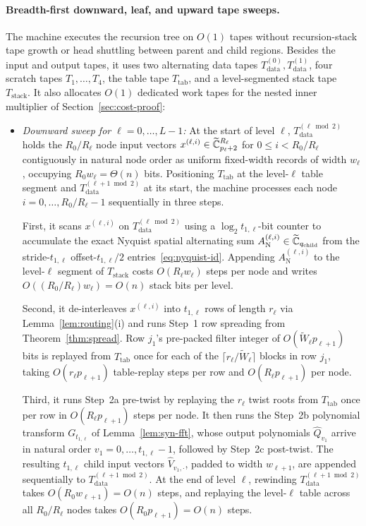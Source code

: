 \paragraph{Breadth-first downward, leaf, and upward tape sweeps.}
The machine executes the recursion tree on $O(1)$ tapes without recursion-stack tape growth or head shuttling between parent and child regions. Besides the input and output tapes, it uses two alternating data tapes $T_{\mathrm{data}}^{(0)}, T_{\mathrm{data}}^{(1)}$, four scratch tapes $T_1, \dots, T_4$, the table tape $T_{\mathrm{tab}}$, and a level-segmented stack tape $T_{\mathrm{stack}}$. It also allocates $O(1)$ dedicated work tapes for the nested inner multiplier of Section~\ref{sec:cost-proof}:
\begin{itemize}[leftmargin=*]
  \item \emph{Downward sweep for $\ell = 0, \dots, L-1$:} At the start of level $\ell$, $T_{\mathrm{data}}^{(\ell \bmod 2)}$ holds the $R_0 / R_\ell$ node input vectors $x^{(\ell, i)} \in \widetilde{\mathbb{C}}_{p_\ell+2}^{R_\ell}$ for $0 \le i < R_0 / R_\ell$ contiguously in natural node order as uniform fixed-width records of width $w_\ell$, occupying $R_0 w_\ell = \Theta(n)$ bits. Positioning $T_{\mathrm{tab}}$ at the level-$\ell$ table segment and $T_{\mathrm{data}}^{(\ell+1 \bmod 2)}$ at its start, the machine processes each node $i = 0, \dots, R_0 / R_\ell - 1$ sequentially in three steps.

  First, it scans $x^{(\ell, i)}$ on $T_{\mathrm{data}}^{(\ell \bmod 2)}$ using a $\log_2 t_{1,\ell}$-bit counter to accumulate the exact Nyquist spatial alternating sum $A_{\mathrm{N}}^{(\ell, i)} \in \widetilde{\mathbb{C}}_{q_{\mathrm{child}}}$ from the stride-$t_{1,\ell}$ offset-$t_{1,\ell}/2$ entries~\eqref{eq:nyquist-id}. Appending $A_{\mathrm{N}}^{(\ell, i)}$ to the level-$\ell$ segment of $T_{\mathrm{stack}}$ costs $O(R_\ell w_\ell)$ steps per node and writes $O((R_0/R_\ell) w_\ell) = O(n)$ stack bits per level.

  Second, it de-interleaves $x^{(\ell, i)}$ into $t_{1,\ell}$ rows of length $r_\ell$ via Lemma~\ref{lem:routing}(i) and runs Step~1 row spreading from Theorem~\ref{thm:spread}. Row $j_1$'s pre-packed filter integer of $O(\tilde{W}_\ell p_{\ell+1})$ bits is replayed from $T_{\mathrm{tab}}$ once for each of the $\lceil r_\ell / \tilde{W}_\ell \rceil$ blocks in row $j_1$, taking $O(r_\ell p_{\ell+1})$ table-replay steps per row and $O(R_\ell p_{\ell+1})$ per node.

  Third, it runs Step~2a pre-twist by replaying the $r_\ell$ twist roots from $T_{\mathrm{tab}}$ once per row in $O(R_\ell p_{\ell+1})$ steps per node. It then runs the Step~2b polynomial transform $G_{t_{1,\ell}}$ of Lemma~\ref{lem:syn-fft}, whose output polynomials $\widehat{Q}_{v_1}$ arrive in natural order $v_1 = 0, \dots, t_{1,\ell}-1$, followed by Step~2c post-twist. The resulting $t_{1,\ell}$ child input vectors $\widehat{V}_{v_1, \cdot}$, padded to width $w_{\ell+1}$, are appended sequentially to $T_{\mathrm{data}}^{(\ell+1 \bmod 2)}$. At the end of level $\ell$, rewinding $T_{\mathrm{data}}^{(\ell+1 \bmod 2)}$ takes $O(R_0 w_{\ell+1}) = O(n)$ steps, and replaying the level-$\ell$ table across all $R_0 / R_\ell$ nodes takes $O(R_0 p_{\ell+1}) = O(n)$ steps.


\end{itemize}

